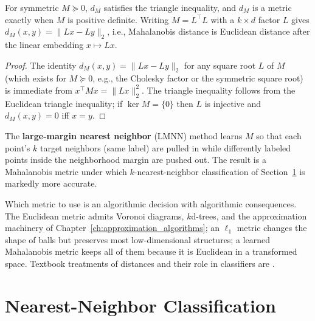 \begin{theorem}\label{thm:data_ml_mahalanobis_metric}
  For symmetric $M \succeq 0$, $d_M$ satisfies the triangle inequality, and
  $d_M$ is a metric exactly when $M$ is positive definite. Writing
  $M = L^{\top} L$ with a $k \times d$ factor $L$ gives
  $d_M(x,y) = \|Lx - Ly\|_2$, i.e., Mahalanobis distance is Euclidean
  distance after the linear embedding $x \mapsto Lx$.
\end{theorem}

\begin{proof}
  The identity $d_M(x,y) = \|Lx - Ly\|_2$ for any square root $L$ of $M$
  (which exists for $M \succeq 0$, e.g., the Cholesky factor or the
  symmetric square root) is immediate from $x^{\top} M x = \|Lx\|_2^2$. The
  triangle inequality follows from the Euclidean triangle inequality; if
  $\ker M = \{0\}$ then $L$ is injective and $d_M(x,y) = 0$ iff $x = y$.
\end{proof}

\begin{example}\label{ex:data_ml_lmnn}
  The \textbf{large-margin nearest neighbor} (LMNN) method \cite{weinberger2006}
  learns $M$ so that each point's $k$ target neighbors (same label) are
  pulled in while differently labeled points inside the neighborhood margin
  are pushed out. The result is a Mahalanobis metric under which
  $k$-nearest-neighbor classification of
  Section~\ref{sec:data_ml_nn_classification} is markedly more accurate.
\end{example}

\begin{remark}
  Which metric to use is an algorithmic decision with algorithmic
  consequences. The Euclidean metric admits Voronoi diagrams, $k$d-trees,
  and the approximation machinery of Chapter~\ref{ch:approximation_algorithms};
  an $\ell_1$ metric changes the shape of balls but preserves most
  low-dimensional structures; a learned Mahalanobis metric keeps all of them
  because it is Euclidean in a transformed space. Textbook treatments of
  distances and their role in classifiers are \cite{bishop2006,duda2001,hastie2009}.
\end{remark}


\section{Nearest-Neighbor Classification}
\label{sec:data_ml_nn_classification}

